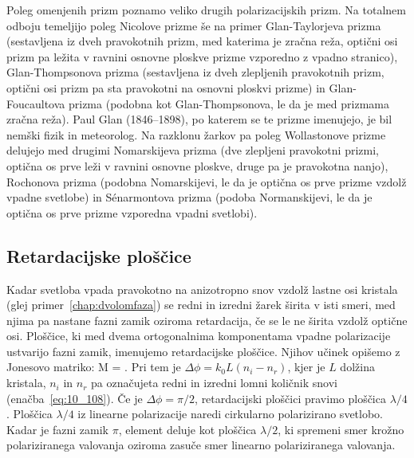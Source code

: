 \begin{remark}
Poleg omenjenih prizm poznamo veliko drugih polarizacijskih prizm. Na totalnem odboju temeljijo
poleg Nicolove prizme še na primer Glan-Taylorjeva prizma (sestavljena iz dveh pravokotnih prizm, 
med katerima je zračna reža, optični osi prizm pa ležita v ravnini osnovne ploskve prizme vzporedno 
z vpadno stranico), Glan-Thompsonova prizma (sestavljena iz dveh zlepljenih pravokotnih prizm, 
optični osi prizm pa sta pravokotni na osnovni ploskvi prizme) in Glan-Foucaultova prizma 
(podobna kot Glan-Thompsonova, le da je med prizmama zračna reža). Paul Glan (1846--1898), 
po katerem se te prizme imenujejo, je bil nemški fizik in meteorolog. Na razklonu žarkov
pa poleg Wollastonove prizme delujejo med drugimi Nomarskijeva prizma (dve zlepljeni pravokotni prizmi, 
optična os prve leži v ravnini osnovne ploskve, druge pa je pravokotna nanjo), Rochonova prizma
(podobna Nomarskijevi, le da je optična os prve prizme vzdolž vpadne svetlobe) in 
S\'enarmontova prizma (podoba Normanskijevi, le da je optična os prve prizme vzporedna vpadni svetlobi).
\end{remark}

\subsection*{Retardacijske ploščice}
Kadar svetloba vpada pravokotno na anizotropno snov vzdolž lastne osi kristala 
(glej primer~\ref{chap:dvolomfaza}) se redni in 
izredni žarek širita v isti smeri, med njima pa nastane fazni zamik oziroma retardacija, če se le 
ne širita vzdolž optične osi.
Ploščice, ki med dvema ortogonalnima komponentama vpadne polarizacije ustvarijo
fazni zamik, imenujemo retardacijske ploščice. Njihov učinek opišemo z Jonesovo matriko:
\beq
M = 
\!\!.
\label{eq:10_120}
\eeq
Pri tem je $\Delta \phi = k_0 L (n_i-n_r)$, kjer je $L$ dolžina kristala, $n_i$ in $n_r$
pa označujeta redni in izredni lomni količnik snovi (enačba~\ref{eq:10_108}). 
Če je $\Delta \phi= \pi/2$, retardacijski ploščici pravimo ploščica $\lambda/4$. 
Ploščica $\lambda/4$ iz linearne polarizacije naredi cirkularno polarizirano svetlobo. 
Kadar je fazni zamik $\pi$, element deluje kot ploščica $\lambda/2$, ki spremeni smer
krožno polariziranega valovanja oziroma zasuče smer linearno polariziranega valovanja.

